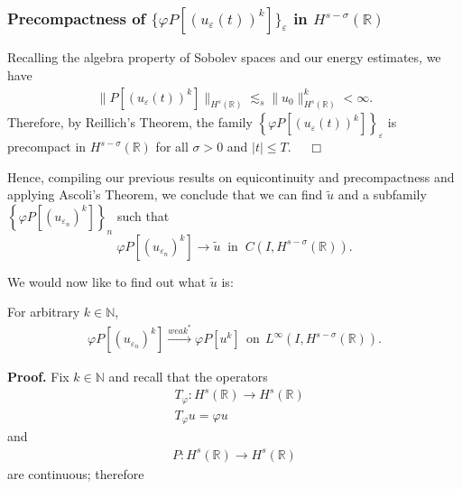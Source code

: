 \documentclass{beamer}
\newcommand{\rr}{\mathbb{R}}
\newcommand{\ee}{\varepsilon}
\begin{document}
\begin{frame}
\frametitle{Precompactness of $\{\varphi P [(u_\ee(t))^k]\}_\ee$ in
$H^{s-\sigma  }(\rr)$}
Recalling the algebra property of Sobolev
spaces and our energy estimates, we have
\begin{equation*}
\begin{split}
\|P [(u_\ee(t))^k]\|_{H^{s}(\rr)}
\lesssim_s \|u_0 \|^k_{H^s(\rr)} < \infty.
\end{split}
\end{equation*}
Therefore, by Reillich's Theorem, the family $\left\{
\varphi P [(u_\ee(t))^k] \right\}_\ee$ is
precompact in $H^{s- \sigma }(\rr)$ for all $\sigma > 0$ and $|t| \le T$. $\quad
\Box$ 
\vskip0.1in
\end{frame}
\begin{frame}
Hence, compiling our previous results on equicontinuity and precompactness
and applying Ascoli's Theorem, we
conclude that we can find $\tilde{u}$ and a subfamily 
\\ $\left\{
\varphi P [(u_{\ee_n})^k]
\right\}_n$ such that
\begin{equation}
\label{hhstrong-conv-of-u_ep}
\varphi P [(u_{\ee_n})^k] \to \tilde{u}
\; \; \text{in} \; \; C(I, H^{s-\sigma}(\rr)).
\end{equation}
%
%

\vskip0.1in
We would now like to find out what $\tilde{u}$ is:
\end{frame}
\begin{frame}
%
%
%
\vskip0.1in
\begin{lemma}
\label{hhlem:crit-conv}
For arbitrary $k \in \mathbb{N}$,
\begin{equation}
\begin{split}
\varphi P [(u_{\ee_n})^k] \xrightarrow{weak^*}
\varphi P [u^k] \ \ \text{on} \ \ L^\infty(I,
H^{s-\sigma}(\rr)).
\label{hhcrit-conv-est}
\end{split}
\end{equation}
\end{lemma}
{\bf Proof.} 
Fix $k \in \mathbb{N}$ and recall that the operators 
\begin{equation*}
\begin{split}
& T_\varphi: H^s(\rr) \to H^s(\rr)\\
& T_\varphi u = \varphi u
\end{split}
\end{equation*}
and 
\begin{equation*}
\begin{split}
P:H^s(\rr) \to H^s(\rr)
\end{split}
\end{equation*}
are continuous; therefore 
\end{frame}
\end{document}
